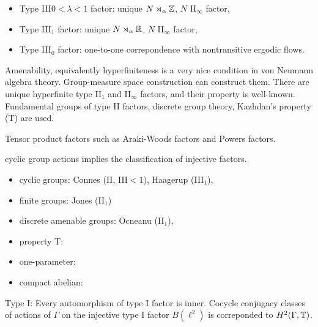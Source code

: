 \documentclass{../../large}
\begin{document}
\begin{itemize}
\item Type III$0<\lambda<1$ factor: unique $N\rtimes_\alpha\mathbb{Z}$, $N$ II$_\infty$ factor,
\item Type III$_1$ factor: unique $N\rtimes_\alpha\mathbb{R}$, $N$ II$_\infty$ factor,
\item Type III$_0$ factor: one-to-one correpondence with nontransitive ergodic flows.
\end{itemize}

Amenability, equivalently hyperfiniteness is a very nice condition in von Neumann algebra theory.
Group-measure space construction can construct them.
There are unique hyperfinite type II$_1$ and II$_\infty$ factors, and their property is well-known.
Fundamental groups of type II factors, discrete group theory, Kazhdan's property (T) are used.

Tensor product factors such as Araki-Woods factors and Powers factors.








cyclic group actions implies the classification of injective factors.

\begin{itemize}
\item cyclic groups: Connes (II, III$<1$), Haagerup (III$_1$),
\item finite groups: Jones (II$_1$)
\item discrete amenable groups: Ocneanu (II$_1$), 
\item property T:
\item one-parameter:
\item compact abelian:
\end{itemize}

Type I:
Every automorphism of type I factor is inner.
Cocycle conjugacy classes of actions of $\Gamma$ on the injective type I factor $B(\ell^2)$ is correponded to $H^2(\Gamma,\mathbb{T})$.
\end{document}
